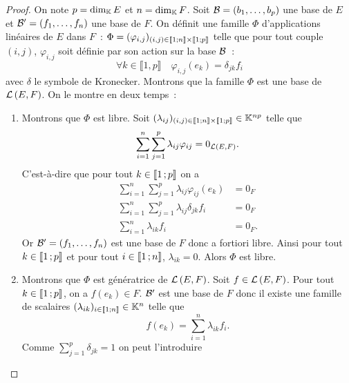 \begin{proof}
  On note \(p=\operatorname{dim}_{\mathbb{K}} E\) et \(n=\operatorname{dim}_{\mathbb{K}} F\). Soit \(\mathcal{B}=(b_1, \ldots, b_p)\) une 
  base de \(E\) et \(\mathcal{B}'=(f_1, \ldots, f_n)\) une base de \(F\). On définit une 
  famille \(\Phi\) d'applications linéaires de \(E\) dans \(F\)~: \(\Phi = 
  (\varphi_{i,j})_{(i,j) \in \mathopen{\llbracket}1\mathclose{}\mathpunct{};n\mathclose{\rrbracket} \times 
  \mathopen{\llbracket}1\mathclose{}\mathpunct{};p\mathclose{\rrbracket}}\) telle que pour tout couple \((i,j)\), 
  \(\varphi_{i,j}\) soit définie par son action sur la base \(\mathcal{B}\)~:
  \begin{equation}
    \forall k \in \llbracket 1,p \rrbracket \quad \varphi_{i,j}(e_k)= 
    \delta_{jk} f_i
  \end{equation}
  avec \(\delta\) le symbole de Kronecker. Montrons que la famille \(\Phi\) est 
  une base de \(\mathcal{L}\left(E,F\right)\). On le montre en deux temps~:
  \begin{enumerate}
    \item Montrons que \(\Phi\) est libre. Soit \((\lambda_{ij})_{(i,j) \in 
      \mathopen{\llbracket}1\mathclose{}\mathpunct{};n\mathclose{\rrbracket} \times \mathopen{\llbracket}1\mathclose{}\mathpunct{};p\mathclose{\rrbracket}} \in \mathbb{K}^{np}\) 
      telle que
      \begin{equation}
        \sum_{i=1}^n \sum_{j=1}^p \lambda_{ij} \varphi_{ij} =0_{\mathcal{L}\left(E,F\right)}.
      \end{equation}
      C'est-à-dire que pour tout \(k \in \mathopen{\llbracket}1\mathclose{}\mathpunct{};p\mathclose{\rrbracket}\) on a
      \begin{align}
        \sum_{i=1}^n \sum_{j=1}^p \lambda_{ij} \varphi_{ij}(e_k) &=0_F\\
        \sum_{i=1}^n \sum_{j=1}^p \lambda_{ij} \delta_{jk} f_i &=0_F\\
        \sum_{i=1}^n \lambda_{ik} f_i &=0_F.
      \end{align}
      Or \(\mathcal{B}'=(f_1, \ldots, f_n)\) est une base de \(F\) donc a fortiori libre. 
      Ainsi pour tout \(k \in \mathopen{\llbracket}1\mathclose{}\mathpunct{};p\mathclose{\rrbracket}\) et pour tout \(i \in 
      \mathopen{\llbracket}1\mathclose{}\mathpunct{};n\mathclose{\rrbracket}\), \(\lambda_{ik}=0\). Alors \(\Phi\) est libre.
    \item  Montrons que \(\Phi\) est génératrice de \(\mathcal{L}\left(E,F\right)\). Soit \(f \in 
      \mathcal{L}\left(E,F\right)\). Pour tout \(k \in \mathopen{\llbracket}1\mathclose{}\mathpunct{};p\mathclose{\rrbracket}\), on a \(f(e_k) 
      \in F\). \(\mathcal{B}'\) est une base de \(F\) donc il existe une famille de 
      scalaires \((\lambda_{ik})_{i \in  \mathopen{\llbracket}1\mathclose{}\mathpunct{};n\mathclose{\rrbracket}} \in \mathbb{K}^n\) 
      telle que
      \begin{equation}
        f(e_k)= \sum_{i=1}^n \lambda_{ik} f_i.
      \end{equation}
      Comme \(\sum_{j=1}^p \delta_{jk}=1\) on peut l'introduire

\end{enumerate}
\end{proof}
